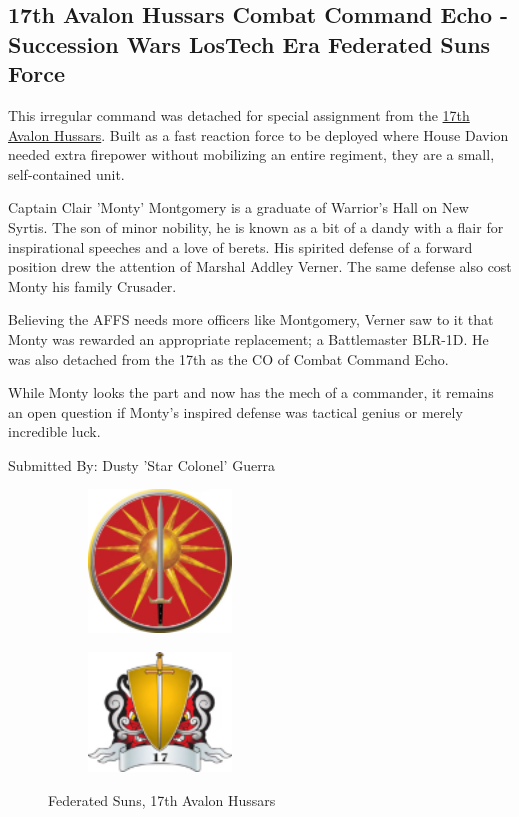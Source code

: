 \subsection{17th Avalon Hussars Combat Command Echo - Succession Wars LosTech Era Federated Suns Force}

This irregular command was detached for special assignment from the \href{https://www.sarna.net/wiki/17th_Avalon_Hussars}{17th Avalon Hussars}.
Built as a fast reaction force to be deployed where House Davion needed extra firepower without mobilizing an entire regiment, they are a small, self-contained unit.

Captain Clair 'Monty' Montgomery is a graduate of Warrior's Hall on New Syrtis.
The son of minor nobility, he is known as a bit of a dandy with a flair for inspirational speeches and a love of berets.
His spirited defense of a forward position drew the attention of Marshal Addley Verner.
The same defense also cost Monty his family Crusader.

Believing the AFFS needs more officers like Montgomery, Verner saw to it that Monty was rewarded an appropriate replacement; a Battlemaster BLR-1D.
He was also detached from the 17th as the CO of Combat Command Echo. 
 
While Monty looks the part and now has the mech of a commander, it remains an open question if Monty’s inspired defense was tactical genius or merely incredible luck.

Submitted By: Dusty 'Star Colonel' Guerra

\begin{figure}[!h]
  \begin{center}
  \begin{subfigure}{0.4\textwidth}
  \centering
  \includegraphics[alt='Federated Suns Logo', width=1.5in, height=1.5in]{img/Federated-Suns.png}
  \end{subfigure}
  \hspace{1in}
  \begin{subfigure}{0.4\textwidth}
  \centering
  \includegraphics[alt='17th Avalon Hussars Logo', width=1.5in, height=1.25in]{img/17-Avalon-Hussars.png}
  \end{subfigure}
  \caption*{Federated Suns, 17th Avalon Hussars}
  \end{center}
\end{figure}

